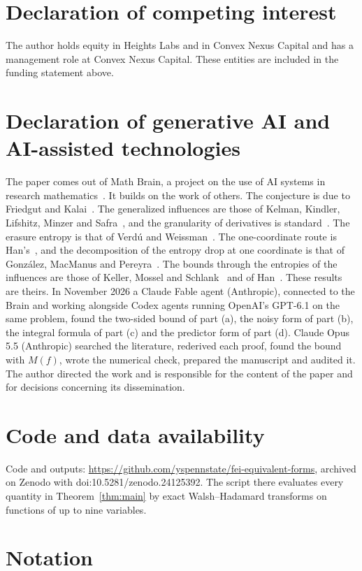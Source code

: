 \documentclass[11pt]{amsart}
\theoremstyle{remark}
\begin{document}
\section*{Declaration of competing interest}
The author holds equity in Heights Labs and in Convex Nexus Capital and has a management role at Convex Nexus Capital.
These entities are included in the funding statement above.

\section*{Declaration of generative AI and AI-assisted technologies}
The paper comes out of Math Brain, a project on the use of AI systems in research
mathematics~\cite{BrainFramework,MathBrainRepo}. It builds on the work of others. The conjecture is due to Friedgut
and Kalai~\cite{FK96}. The generalized influences are those of Kelman, Kindler, Lifshitz, Minzer and
Safra~\cite{KKLMS}, and the granularity of derivatives is standard~\cite{OD14}. The erasure entropy is that of Verd\'u
and Weissman~\cite{VW08}. The one-coordinate route is Han's~\cite{Han}, and the decomposition of the entropy drop at
one coordinate is that of Gonz\'alez, MacManus and Pereyra~\cite{GMP}. The bounds through the entropies of the
influences are those of Keller, Mossel and Schlank~\cite{KMS} and of Han~\cite{Han}. These results are theirs. In
November 2026 a Claude Fable agent (Anthropic), connected to the Brain and working alongside Codex agents running
OpenAI's GPT-6.1 on the same problem, found the two-sided bound of part (a), the noisy form of part (b), the integral
formula of part (c) and the predictor form of part (d). Claude Opus 5.5 (Anthropic) searched the literature,
rederived each proof, found the bound with $M(f)$, wrote the numerical check, prepared the manuscript and audited it.
The author directed the work and is responsible for the content of the paper and for decisions concerning its dissemination.

\section*{Code and data availability}
Code and outputs: \url{https://github.com/yspennstate/fei-equivalent-forms}, archived on Zenodo with doi:10.5281/zenodo.24125392. The script there evaluates every quantity in
Theorem~\ref{thm:main} by exact Walsh--Hadamard transforms on functions of up to nine variables.

\appendix
\section{Notation}\label{app:notation}
\end{document}
